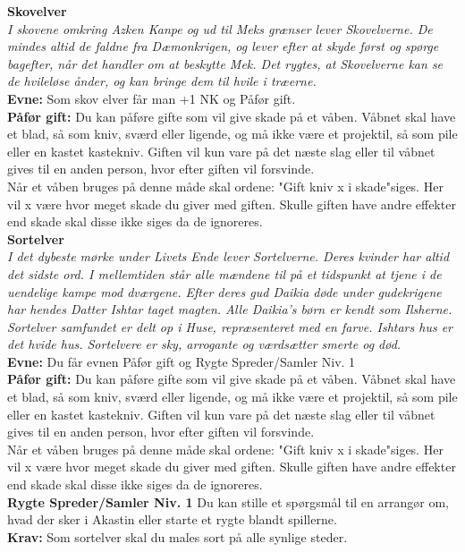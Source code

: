 \textbf{Skovelver}\\
\textit{I skovene omkring Azken Kanpe og ud til Meks grænser lever Skovelverne. De mindes altid de faldne fra Dæmonkrigen, og lever efter at skyde først og spørge bagefter, når det handler om at beskytte Mek. Det rygtes, at Skovelverne kan se de hvileløse ånder, og kan bringe dem til hvile i træerne.}\\
\textbf{Evne:} Som skov elver får man +1 NK og Påfør gift.\\
\textbf{Påfør gift:} Du kan påføre gifte som vil give skade på et våben. Våbnet skal have et blad, så som
kniv, sværd eller ligende, og må ikke være et projektil, så som pile eller en kastet kastekniv. Giften vil kun vare på det næste slag eller til våbnet gives til en anden person,
hvor efter giften vil forsvinde.\\
Når et våben bruges på denne måde skal ordene: "Gift kniv x i skade"siges. Her vil x være hvor meget skade du giver med giften. Skulle giften have andre effekter end skade skal disse ikke siges da de ignoreres.\\


\textbf{Sortelver}\\
\textit{I det dybeste mørke under Livets Ende lever Sortelverne. Deres kvinder har altid det sidste ord. I mellemtiden står alle mændene til på et tidspunkt at tjene i de uendelige kampe mod dværgene. Efter deres gud Daikia døde under gudekrigene har hendes Datter Ishtar taget magten. Alle Daikia's børn er kendt som Ilsherne. Sortelver samfundet er delt op i Huse, repræsenteret med en farve. Ishtars hus er det hvide hus. Sortelvere er sky, arrogante og værdsætter smerte og død.}\\
\textbf{Evne:} Du får evnen Påfør gift og Rygte Spreder/Samler Niv. 1\\
\textbf{Påfør gift:} Du kan påføre gifte som vil give skade på et våben. Våbnet skal have et blad, så som
kniv, sværd eller ligende, og må ikke være et projektil, så som pile eller en kastet kastekniv. Giften vil kun vare på det næste slag eller til våbnet gives til en anden person,
hvor efter giften vil forsvinde.\\
Når et våben bruges på denne måde skal ordene: "Gift kniv x i skade"siges. Her vil x være hvor meget skade du giver med giften. Skulle giften have andre effekter end skade skal disse ikke siges da de ignoreres.\\
\textbf{Rygte Spreder/Samler Niv. 1}
Du kan stille et spørgsmål til en arrangør om, hvad der sker i Akastin eller starte et rygte blandt spillerne.\\
\textbf{Krav:} Som sortelver skal du males sort på alle synlige steder.\\


